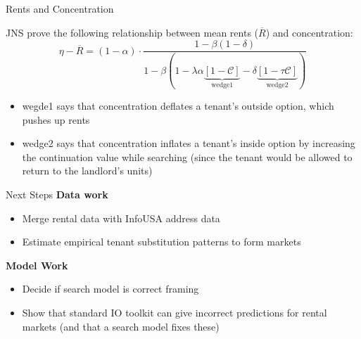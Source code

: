 \documentclass[10pt, xcolor=dvipsnames]{beamer}
\begin{document}
\begin{frame}{Rents and Concentration}

JNS prove the following relationship between mean rents ($\overline{R}$) and concentration:\\

\begin{equation}\label{eq:concentration-rents}
    \eta - \overline{R} = (1 - \alpha) \cdot \frac{1 - \beta(1 - \delta)}{1 - \beta \left( 1 - \lambda \alpha \underbrace{[1 - \mathcal{C}]}_{\text{wedge1}} - \delta \underbrace{[1 - \tau \mathcal{C}]}_{\text{wedge2}} \right)}
\end{equation}
\begin{itemize}
    \item wegde1 says that concentration deflates a tenant's outside option, which pushes up rents
    \item wedge2 says that concentration inflates a tenant's inside option by increasing the continuation value while searching (since the tenant would be allowed to return to the landlord's units)
\end{itemize}

\end{frame}

\begin{frame}{Next Steps}
\textbf{Data work}
    \begin{itemize}
        \item Merge rental data with InfoUSA address data
        \item Estimate empirical tenant substitution patterns to form markets
    \end{itemize}
\textbf{Model Work}
\begin{itemize}
    \item Decide if search model is correct framing
    \item Show that standard IO toolkit can give incorrect predictions for rental markets (and that a search model fixes these)
\end{itemize}
\end{frame}
\end{document}
